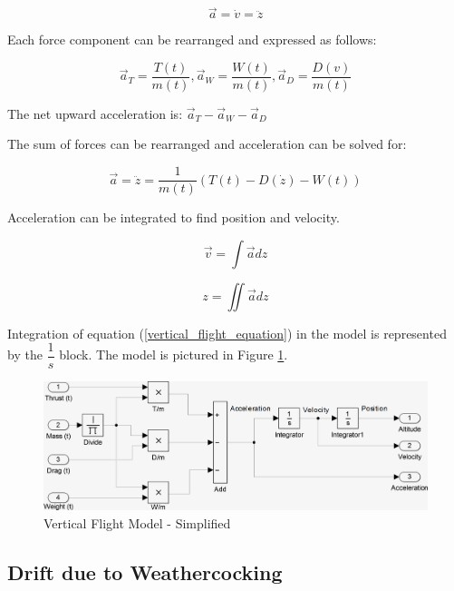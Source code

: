 \documentclass[]{article}
\begin{document}
\begin{equation}
\vec{a} = \dot{v} = \ddot{z}
\end{equation}

Each force component can be rearranged and expressed as follows:

\begin{equation}
\vec{a}_T = \dfrac{T(t)}{m(t)}, \vec{a}_W = \dfrac{W(t)}{m(t)}, \vec{a}_D = \dfrac{D(v)}{m(t)}
\end{equation}

The net upward acceleration is: \(\vec{a}_T - \vec{a}_W - \vec{a}_D\)

The sum of forces can be rearranged and acceleration can be solved for:

\begin{equation}
\label{vertical_flight_equation}
\vec{a} =  \ddot{z} = \dfrac{1}{m(t)} (T(t) - D(\dot{z}) - W(t)) 
\end{equation}

Acceleration can be integrated to find position and velocity.

\begin{equation}
\vec{v} = \int \vec{a} dz
\end{equation}

\begin{equation}
z = \iint \vec{a} dz
\end{equation}

Integration of equation (\ref{vertical_flight_equation}) in the model is
represented by the \(\dfrac{1}{s}\) block. The model is pictured in
Figure \ref{vertical_model_simplified}.

\begin{figure}[htbp]
\centering
\includegraphics{images/vertical_model_simplified.png}
\caption{Vertical Flight Model - Simplified
\label{vertical_model_simplified}}
\end{figure}

\subsection{Drift due to
Weathercocking}\label{drift-due-to-weathercocking}
\end{document}
